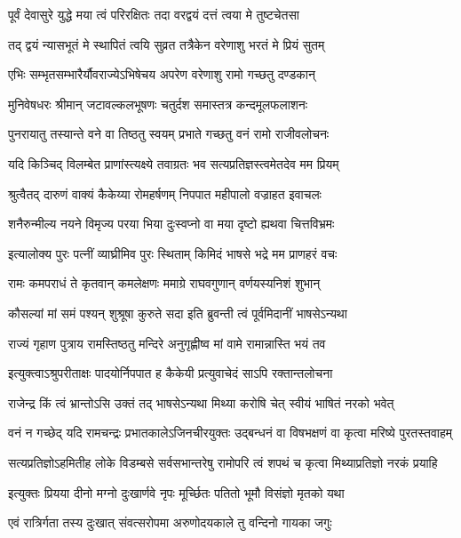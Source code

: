 \twolineshloka
{पूर्वं देवासुरे युद्धे मया त्वं परिरक्षितः}
{तदा वरद्वयं दत्तं त्वया मे तुष्टचेतसा} %

\twolineshloka
{तद् द्वयं न्यासभूतं मे स्थापितं त्वयि सुव्रत}
{तत्रैकेन वरेणाशु भरतं मे प्रियं सुतम्} %

\twolineshloka
{एभिः सम्भृतसम्भारैर्यौवराज्येऽभिषेचय}
{अपरेण वरेणाशु रामो गच्छतु दण्डकान्} %

\twolineshloka
{मुनिवेषधरः श्रीमान् जटावल्कलभूषणः}
{चतुर्दश समास्तत्र कन्दमूलफलाशनः} %

\twolineshloka
{पुनरायातु तस्यान्ते वने वा तिष्ठतु स्वयम्}
{प्रभाते गच्छतु वनं रामो राजीवलोचनः} %

\twolineshloka
{यदि किञ्चिद् विलम्बेत प्राणांस्त्यक्ष्ये तवाग्रतः}
{भव सत्यप्रतिज्ञस्त्वमेतदेव मम प्रियम्} %

\twolineshloka
{श्रुत्वैतद् दारुणं वाक्यं कैकेय्या रोमहर्षणम्}
{निपपात महीपालो वज्राहत इवाचलः} %

\twolineshloka
{शनैरुन्मील्य नयने विमृज्य परया भिया}
{दुःस्वप्नो वा मया दृष्टो ह्यथवा चित्तविभ्रमः} %

\twolineshloka
{इत्यालोक्य पुरः पत्नीं व्याघ्रीमिव पुरः स्थिताम्}
{किमिदं भाषसे भद्रे मम प्राणहरं वचः} %

\twolineshloka
{रामः कमपराधं ते कृतवान् कमलेक्षणः}
{ममाग्रे राघवगुणान् वर्णयस्यनिशं शुभान्} %

\twolineshloka
{कौसल्यां मां समं पश्यन् शुश्रूषा कुरुते सदा}
{इति ब्रुवन्ती त्वं पूर्वमिदानीं भाषसेऽन्यथा} %

\twolineshloka
{राज्यं गृहाण पुत्राय रामस्तिष्ठतु मन्दिरे}
{अनुगृह्णीष्व मां वामे रामान्नास्ति भयं तव} %

\twolineshloka
{इत्युक्त्वाऽश्रुपरीताक्षः पादयोर्निपपात ह}
{कैकेयी प्रत्युवाचेदं साऽपि रक्तान्तलोचना} %

\twolineshloka
{राजेन्द्र किं त्वं भ्रान्तोऽसि उक्तं तद् भाषसेऽन्यथा}
{मिथ्या करोषि चेत् स्वीयं भाषितं नरको भवेत्} %

\fourlineindentedshloka
{वनं न गच्छेद् यदि रामचन्द्रः}
{प्रभातकालेऽजिनचीरयुक्तः}
{उद्बन्धनं वा विषभक्षणं वा}
{कृत्वा मरिष्ये पुरतस्तवाहम्} %

\fourlineindentedshloka
{सत्यप्रतिज्ञोऽहमितीह लोके}
{विडम्बसे सर्वसभान्तरेषु}
{रामोपरि त्वं शपथं च कृत्वा}
{मिथ्याप्रतिज्ञो नरकं प्रयाहि} %

\twolineshloka
{इत्युक्तः प्रियया दीनो मग्नो दुःखार्णवे नृपः}
{मूर्च्छितः पतितो भूमौ विसंज्ञो मृतको यथा} %

\twolineshloka
{एवं रात्रिर्गता तस्य दुःखात् संवत्सरोपमा}
{अरुणोदयकाले तु वन्दिनो गायका जगुः} %

